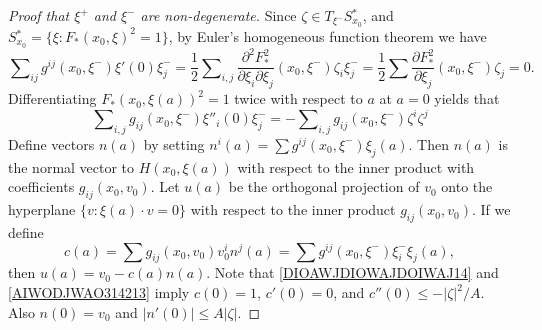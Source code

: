 \begin{proof}[Proof that $\xi^+$ and $\xi^-$ are non-degenerate]
    Since $\zeta \in T_{\xi^-} S\!_{x_0}^*$, and $S\!_{x_0}^* = \{ \xi : F_*(x_0,\xi)^2 = 1 \}$, by Euler's homogeneous function theorem we have
    \begin{equation} \label{DIOAWJDIOWAJDOIWAJ14}
        \sum\nolimits_{ij} g^{ij}(x_0,\xi^-) \xi'(0) \xi^-_j = \frac{1}{2} \sum\nolimits_{i,j} \frac{\partial^2 F_*^2}{\partial \xi_i \partial \xi_j}(x_0,\xi^-) \zeta_i \xi^-_j = \frac{1}{2} \sum \frac{\partial F_*^2}{\partial \xi_j}(x_0,\xi^-) \zeta_j = 0.
    \end{equation}
    Differentiating $F_*(x_0,\xi(a))^2 = 1$ twice with respect to $a$ at $a = 0$ yields that
    \begin{equation} \label{AIWODJWAO314213}
         \sum\nolimits_{i,j} g_{ij}(x_0,\xi^-) \xi''_i(0) \xi^-_j = - \sum\nolimits_{i,j} g_{ij}(x_0,\xi^-) \zeta^i \zeta^j
    \end{equation}
    Define vectors $n(a)$ by setting $n^i(a) = \sum g^{ij}(x_0,\xi^-) \xi_j(a)$. Then $n(a)$ is the normal vector to $H(x_0, \xi(a))$ with respect to the inner product with coefficients $g_{ij}(x_0,v_0)$.
    Let $u(a)$ be the orthogonal projection of $v_0$ onto the hyperplane $\{ v : \xi(a) \cdot v = 0 \}$ with respect to the inner product $g_{ij}(x_0,v_0)$. If we define
    \begin{equation}
        c(a) = \sum g_{ij}(x_0,v_0) v_0^i n^j(a) = \sum g^{ij}(x_0,\xi^-) \xi^-_i \xi_j(a),
    \end{equation}
    then $u(a) = v_0 - c(a) n(a)$. Note that \eqref{DIOAWJDIOWAJDOIWAJ14} and \eqref{AIWODJWAO314213} imply $c(0) = 1$, $c'(0) = 0$, and $c''(0) \leq - |\zeta|^2 / A$. Also $n(0) = v_0$ and $|n'(0)| \leq A |\zeta|$.


\end{proof}
